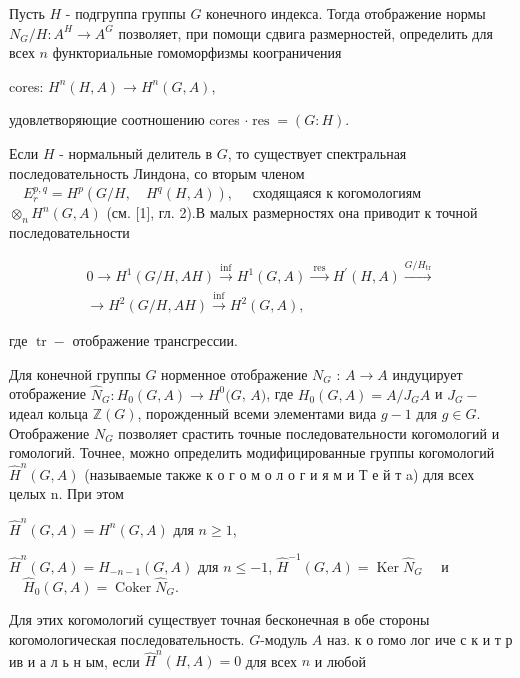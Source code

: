 \documentclass[10pt]{article}
\begin{document}
Пусть $H$ - подгруппа группы $G$ конечного индекса. Тогда отображение нормы $N_{G} / H: A^{H} \rightarrow A^{G}$ позволяет, при помощи сдвига размерностей, определить для всех $n$ функториальные гомоморфизмы коограничения



cores: $H^{n}(H, A) \longrightarrow H^{n}(G, A)$,



удовлетворяющие соотношению cores $\cdot \operatorname{res}=(G: H)$.



Если $H$ - нормальный делитель в $G$, то существует спектральная последовательность Линдона, со вторым членом $\quad E_{r}^{p, q}=H^{p}\left(G / H, \quad H^{q}(H, A)\right), \quad$ сходящаяся к когомологиям $\otimes_{n} H^{n}(G, A)$ (см. [1], гл. 2).В малых размерностях она приводит $к$ точной последовательности



\[

\begin{gathered}

0 \longrightarrow H^{1}(G / H, A H) \stackrel{\inf }{\longrightarrow} H^{1}(G, A) \stackrel{\text { res }}{\longrightarrow} H^{\prime}(H, A) \stackrel{G / H_{\mathrm{tr}}}{\longrightarrow} \\

\longrightarrow H^{2}(G / H, A H) \stackrel{\inf }{\longrightarrow} H^{2}(G, A),

\end{gathered}

\]



где $\operatorname{tr}-$ отображение трансгрессии.



Для конечной группы $G$ норменное отображение $N_{G}$ : $A \rightarrow A$ индуцирует отображение $\hat{N}_{G}: H_{0}(G, A) \rightarrow H^{0}(G$, $A)$, где $H_{0}(G, A)=A / J_{G} A$ и $J_{G}-$ идеал кольца $\mathbb{Z}(G)$, порожденный всеми элементами вида $g-1$ для $g \in G$. Отображение $N_{G}$ позволяет срастить точные последовательности когомологий и гомологий. Точнее, можно определить модифицированные группы когомологий $\widehat{H}^{n}(G, A)$ (называемые также к о г о м о л о г и я м и Т е й т a) для всех целых n. При этом



$\hat{H}^{n}(G, A)=H^{n}(G, A)$ для $n \geqslant 1$,



$\hat{H}^{n}(G, A)=H_{-n-1}(G, A)$ для $n \leqslant-1$, $\hat{H}^{-1}(G, A)=\operatorname{Ker} \hat{N}_{G} \quad$ и $\quad \hat{H}_{0}(G, A)=\operatorname{Coker} \hat{N}_{G}$.



Для этих когомологий существует точная бесконечная в обе стороны когомологическая последовательность. $G$-модуль $A$ наз. к о гомо лог иче с к и т р ив и а л ь н ым, если $\widehat{H}^{n}(H, A)=0$ для всех $n$ и любой
\end{document}
